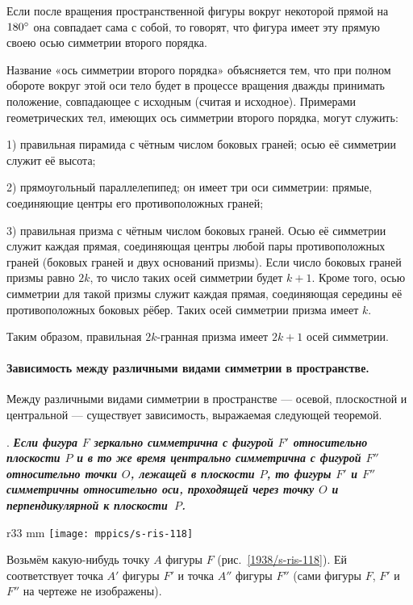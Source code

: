 Если после вращения пространственной фигуры вокруг некоторой прямой на $180\degree$ она совпадает сама с собой, то говорят, что фигура имеет эту прямую своею осью симметрии второго порядка.

Название «ось симметрии второго порядка» объясняется тем, что при полном обороте вокруг этой оси тело будет в процессе вращения дважды принимать положение, совпадающее с исходным (считая и исходное).
Примерами геометрических тел, имеющих ось симметрии второго порядка, могут служить:

1) правильная пирамида с чётным числом боковых граней;
осью её симметрии служит её высота;

2) прямоугольный параллелепипед;
он имеет три оси симметрии: прямые, соединяющие центры его противоположных граней;

3) правильная призма с чётным числом боковых граней.
Осью её симметрии служит каждая прямая, соединяющая центры любой пары противоположных граней (боковых граней и двух оснований призмы).
Если число боковых граней призмы равно $2k$, то число таких осей симметрии будет $k+1$.
Кроме того, осью симметрии для такой призмы служит каждая прямая, соединяющая середины её противоположных боковых рёбер.
Таких осей симметрии призма имеет $k$.

Таким образом, правильная $2k$-гранная призма имеет $2k+1$ осей симметрии.

\paragraph{Зависимость между различными видами симметрии в пространстве.}\label{1938/s102}
Между различными видами симметрии в пространстве — осевой, плоскостной и центральной — существует зависимость, выражаемая следующей теоремой.

\medskip

.
\textbf{\emph{Если фигура $F$ зеркально симметрична с фигурой $F'$ относительно плоскости $P$ и в то же время центрально симметрична с фигурой $F''$ относительно точки $O$, лежащей в плоскости $P$, то фигуры $F'$ и $F''$ симметричны относительно оси, проходящей через точку $O$ и перпендикулярной к плоскости~$P$.}}

\begin{wrapfigure}{r}{33 mm}
\vskip-0mm
\centering
\texttt{[image: mppics/s-ris-118]}
\caption{}\label{1938/s-ris-118}
\vskip-0mm
\end{wrapfigure}

Возьмём какую-нибудь точку $A$ фигуры $F$ (рис.~\ref{1938/s-ris-118}).
Ей соответствует точка $A'$ фигуры $F'$ и точка $A''$ фигуры $F''$ (сами фигуры $F$, $F'$ и $F''$ на чертеже не изображены).

